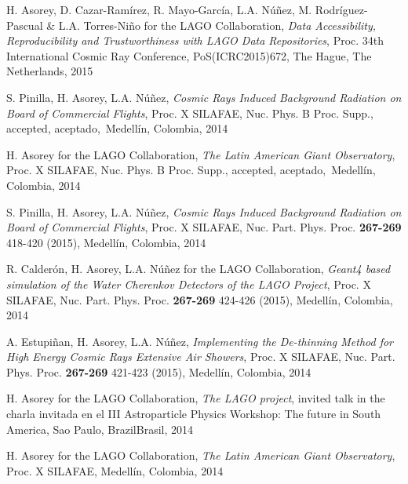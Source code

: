\begin{etaremune}
\item {}H. Asorey, D. Cazar-Ramírez, R. Mayo-García, L.A. Núñez, M. Rodríguez-Pascual \& L.A. Torres-Niño for the LAGO Collaboration, {\emph{Data Accessibility, Reproducibility and Trustworthiness with LAGO Data Repositories}}, \en Proc. 34th International Cosmic Ray Conference, PoS(ICRC2015)672, The Hague, The Netherlands, 2015

\item {}S. Pinilla, H. Asorey, L.A. Núñez, {\emph{Cosmic Rays Induced Background Radiation on Board of Commercial Flights}}, \en Proc. X SILAFAE, Nuc. Phys. B Proc. Supp., \ifeng accepted, \else aceptado,\fi\ Medellín, Colombia, 2014

\item {}H. Asorey for the LAGO Collaboration, {\emph{The Latin American Giant Observatory}}, \en Proc. X SILAFAE, Nuc. Phys. B Proc. Supp., \ifeng accepted, \else aceptado,\fi\ Medellín, Colombia, 2014

\item {}S. Pinilla, H. Asorey, L.A. Núñez, {\emph{Cosmic Rays Induced Background Radiation on Board of Commercial Flights}}, \en Proc. X SILAFAE,  Nuc. Part. Phys. Proc. {\bf{267-269}} 418-420 (2015), Medellín, Colombia, 2014

\item {}R. Calderón, H. Asorey, L.A. Núñez for the LAGO Collaboration, {\emph{Geant4 based simulation of the Water Cherenkov Detectors of the LAGO Project}}, \en Proc. X SILAFAE, Nuc. Part. Phys. Proc. {\bf{267-269}} 424-426 (2015), Medellín, Colombia, 2014

\item {}A. Estupiñan, H. Asorey, L.A. Núñez, {\emph{Implementing the De-thinning Method for High Energy Cosmic Rays Extensive Air Showers}}, \en Proc. X SILAFAE, Nuc. Part. Phys. Proc. {\bf{267-269}} 421-423 (2015), Medellín, Colombia, 2014

\item {}H. Asorey for the LAGO Collaboration, {\emph{The LAGO project}}, \ifeng invited talk in the \else charla invitada en el \fi III Astroparticle Physics Workshop: The future in South America, Sao Paulo, \ifeng Brazil\else Brasil\fi, 2014
  
\item {}H. Asorey for the LAGO Collaboration, {\emph{The Latin American Giant Observatory}}, \en Proc. X SILAFAE, Medellín, Colombia, 2014


\end{etaremune}
